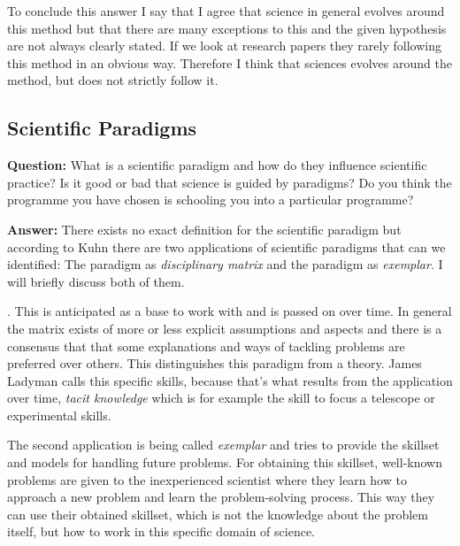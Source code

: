 \documentclass[11pt]{scrartcl}
\begin{document}
To conclude this answer I say that I agree that science in general evolves around this method but that there are many exceptions to this and the given hypothesis are not always clearly stated. If we look at research papers they rarely following this method in an obvious way. Therefore I think that sciences evolves around the method, but does not strictly follow it.

\subsection{Scientific Paradigms}

\textbf{Question:} What is a scientific paradigm and how do they influence scientific practice? Is it good or bad that science is guided by paradigms? Do you think the programme you have chosen is schooling you into a particular programme?

\bigbreak

\textbf{Answer:} There exists no exact definition for the scientific paradigm but according to Kuhn there are two applications of scientific paradigms that can we identified: The paradigm as \textit{disciplinary matrix} and the paradigm as \textit{exemplar}. I will briefly discuss both of them.

 \cite[p. 98]{ladyman}. This is anticipated as a base to work with and is passed on over time. In general the matrix exists of more or less explicit assumptions and aspects and there is a consensus that that some explanations and ways of tackling problems are preferred over others. This distinguishes this paradigm from a theory. James Ladyman calls this specific skills, because that's what results from the application over time, \textit{tacit knowledge} which is for example the skill to focus a telescope or experimental skills.

The second application is being called \textit{exemplar} and tries to provide the skillset and models for handling future problems. For obtaining this skillset, well-known problems are given to the inexperienced scientist where they learn how to approach a new problem and learn the problem-solving process. This way they can use their obtained skillset, which is not the knowledge about the problem itself, but how to work in this specific domain of science.
\end{document}
